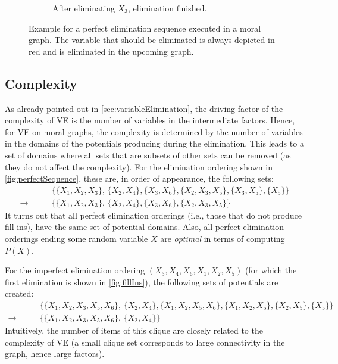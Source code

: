 \begin{figure}
\begin{subfigure}{0.49\linewidth}
				\caption{After eliminating \(X_3\), elimination finished.}
			\end{subfigure}
			\caption[Example for a Perfect Elimination Sequence]{Example for a perfect elimination sequence executed in a moral graph. The variable that should be eliminated is always depicted in {\color{TUDa-9b} red} and is eliminated in the upcoming graph.}
			\label{fig:perfectSequence}
		\end{figure}

		\subsection{Complexity}
			As already pointed out in \autoref{sec:variableElimination}, the driving factor of the complexity of VE is the number of variables in the intermediate factors. Hence, for VE on moral graphs, the complexity is determined by the number of variables in the domains of the potentials producing during the elimination. This leads to a set of domains where all sets that are subsets of other sets can be removed (as they do not affect the complexity). For the elimination ordering shown in \autoref{fig:perfectSequence}, these are, in order of appearance, the following sets:
			\begin{align}
				 & \bigl\{ \{ X_1, X_2, X_3 \},\, \{ X_2, X_4 \}, \{ X_3, X_6 \}, \{ X_2, X_3, X_5 \}, \{ X_3, X_5 \}, \{ X_5 \} \bigr\} \\
				\longrightarrow\qquad
				 & \bigl\{ \{ X_1, X_2, X_3 \},\, \{ X_2, X_4 \}, \{ X_3, X_6 \}, \{ X_2, X_3, X_5 \} \bigr\}
			\end{align}
			It turns out that all perfect elimination orderings (i.e., those that do not produce fill-ins), have the same set of potential domains. Also, all perfect elimination orderings ending some random variable \(X\) are \emph{optimal} in terms of computing \( P(X) \).

			For the imperfect elimination ordering \( (X_3, X_4, X_6, X_1, X_2, X_5) \) (for which the first elimination is shown in \autoref{fig:fillIns}), the following sets of potentials are created:
			\begin{align}
				 & \bigl\{ \{ X_1, X_2, X_3, X_5, X_6 \},\, \{ X_2, X_4 \}, \{ X_1, X_2, X_5, X_6 \}, \{ X_1, X_2, X_5 \}, \{ X_2, X_5 \}, \{ X_5 \} \bigr\} \\
				\longrightarrow\qquad
				 & \bigl\{ \{ X_1, X_2, X_3, X_5, X_6 \},\, \{ X_2, X_4 \} \bigr\}
			\end{align}
			Intuitively, the number of items of this clique are closely related to the complexity of VE (a small clique set corresponds to large connectivity in the graph, hence large factors).

